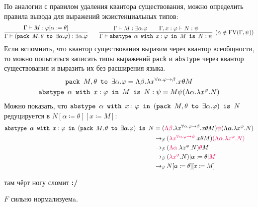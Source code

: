 По аналогии с правилом удаления квантора существования, можно определить правила вывода для выражений экзистенциальных типов:
\[
    \infer{\Gamma\vdash (\pack{M, \theta}{\exists \alpha . \varphi}) : \exists \alpha.\varphi}
        {\Gamma \vdash M : \varphi[\alpha := \theta]} \qquad
    \infer[(\alpha \notin \FV(\Gamma, \psi))]
        {\Gamma \vdash \abstype{\alpha}{x:\varphi}{M}{N:\psi}}
        {\Gamma \vdash M : \exists \alpha . \varphi && \Gamma, x : \varphi \vdash N : \psi}
\]
Если вспомнить, что квантор существования выразим через квантор всеобщности, то можно попытаться записать типы выражений
\texttt{pack} и \texttt{abstype} через квантор существования и выразить их без расширения языка.
\begin{gather*}
    \mathinner{\mathtt{pack}}~M, \theta~\mathinner{\mathtt{to}}~\exists \alpha . \varphi =
        \Lambda \beta . \lambda x^{\forall \alpha . \varphi \rightarrow \beta} . x \theta M \\
    \mathinner{\mathtt{abstype}}~\alpha~\mathinner{\mathtt{with}}~x : \varphi~\mathinner{\mathtt{in}}~M~\mathinner{\mathtt{is}}~N:\psi =
        M \psi (\Lambda \alpha . \lambda x ^ \varphi . N)
\end{gather*}
Можно показать, что $\mathinner{\mathtt{abstype}}~\alpha~\mathinner{\mathtt{with}}~x:\varphi~\mathinner{\mathtt{in}}~(\mathinner{\mathtt{pack}}~M,\theta~\mathinner{\mathtt{to}}~\exists\alpha .\varphi)~\mathinner{\mathtt{is}}~N$
        редуцируется в $N[\alpha\coloneqq\theta][x\coloneqq M]$:
\begin{align*}
    \abstype{\alpha}{x:\varphi}{(\pack{M,\theta}{\exists\alpha .\varphi})}{N}
    &= (\reduction{\Lambda \beta} . \lambda x^{\forall \alpha . \varphi \rightarrow \beta} . x \theta M)
        \reduction{\psi} (\Lambda \alpha . \lambda x ^ \varphi . N) \\
    &\rightarrow_\beta (\reduction{\lambda x^{\forall \alpha . \varphi \rightarrow \psi}} . x \theta M)
        \reduction{(\Lambda \alpha . \lambda x ^ \varphi . N)} \\
    &\rightarrow_\beta (\reduction{\Lambda \alpha} . \lambda x^\varphi . N) \reduction\theta M \\
    &\rightarrow_\beta (\reduction{\lambda x^\varphi} . N)[\alpha\coloneqq\theta] \reduction M \\
    &\rightarrow_\beta N[\alpha\coloneqq\theta][x\coloneqq M]
\end{align*}

\begin{example} \todo там чёрт ногу сломит \textbf{:/}
\end{example}

\begin{statement}
    $F$ сильно нормализуемa.
\end{statement}

